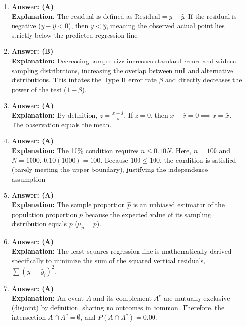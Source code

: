 \begin{enumerate}[leftmargin=1.5em]
  \item \textbf{Answer: (A)} \\
  \textbf{Explanation:} The residual is defined as $\text{Residual} = y - \hat{y}$. If the residual is negative ($y - \hat{y} < 0$), then $y < \hat{y}$, meaning the observed actual point lies strictly below the predicted regression line.

  \item \textbf{Answer: (B)} \\
  \textbf{Explanation:} Decreasing sample size increases standard errors and widens sampling distributions, increasing the overlap between null and alternative distributions. This inflates the Type II error rate $\beta$ and directly decreases the power of the test ($1 - \beta$).

  \item \textbf{Answer: (A)} \\
  \textbf{Explanation:} By definition, $z = \frac{x - \bar{x}}{s}$. If $z = 0$, then $x - \bar{x} = 0 \implies x = \bar{x}$. The observation equals the mean.

  \item \textbf{Answer: (A)} \\
  \textbf{Explanation:} The 10\% condition requires $n \le 0.10N$. Here, $n = 100$ and $N = 1000$. $0.10(1000) = 100$. Because $100 \le 100$, the condition is satisfied (barely meeting the upper boundary), justifying the independence assumption.

  \item \textbf{Answer: (A)} \\
  \textbf{Explanation:} The sample proportion $\hat{p}$ is an unbiased estimator of the population proportion $p$ because the expected value of its sampling distribution equals $p$ ($\mu_{\hat{p}} = p$).

  \item \textbf{Answer: (A)} \\
  \textbf{Explanation:} The least-squares regression line is mathematically derived specifically to minimize the sum of the squared vertical residuals, $\sum (y_i - \hat{y}_i)^2$.

  \item \textbf{Answer: (A)} \\
  \textbf{Explanation:} An event $A$ and its complement $A^c$ are mutually exclusive (disjoint) by definition, sharing no outcomes in common. Therefore, the intersection $A \cap A^c = \emptyset$, and $P(A \cap A^c) = 0.00$.
\end{enumerate}

